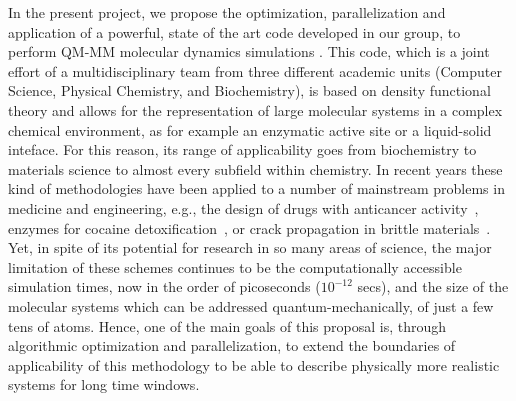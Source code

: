 \documentclass[a4paper,10pt]{article}
\begin{document}
In the present project, we propose the optimization, parallelization and application of a powerful, state of the art code developed in our group, to perform QM-MM molecular
dynamics simulations \cite{Nitsche2014} .
This code, which is a joint effort of a multidisciplinary team from three different academic units (Computer Science, Physical Chemistry, and Biochemistry), is based on density functional theory and allows for the representation of large molecular systems in a complex chemical environment, as for example an enzymatic active site or a liquid-solid inteface.
For this reason, its range of applicability goes from biochemistry to materials science to almost every subfield within chemistry.
In recent years these kind of methodologies have been applied to a number of mainstream problems in medicine and engineering, e.g., the design of drugs with anticancer activity~\cite{Adhireksan2014}, enzymes for cocaine detoxification~\cite{Zheng2014}, or crack propagation in brittle materials~\cite{Kermode2013}.
Yet, in spite of its potential for research in so many areas of science, the major limitation of these schemes continues to be the computationally accessible simulation times, now in the
order of picoseconds ($10^{-12}$ secs), and the size of the molecular systems which can be addressed quantum-mechanically, of just a few tens of atoms.
Hence, one of the main goals of this proposal is, through algorithmic optimization and parallelization, to extend the boundaries of applicability of this methodology to be able to describe physically more realistic systems for long time windows.
\end{document}

